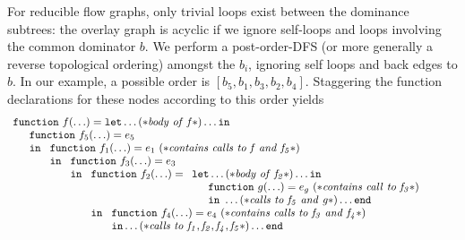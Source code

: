 For reducible flow graphs, only trivial loops exist between the
dominance subtrees: the overlay graph is acyclic if we ignore
self-loops and loops involving the common dominator $b$.  We perform a
post-order-DFS (or more generally a reverse topological ordering)
amongst the $b_i$, ignoring self loops and back edges to $b$. In our
example, a possible order is $[b_5,b_1,b_3,b_2,b_4]$.  Staggering the
function declarations for these nodes according to this order yields
\begin{equation}
\label{FunctionalCascadeFun}
\begin{array}{l}
  \mathtt{function}\ f (\ldots)= 
  \mathtt{let} \ldots (* \mathit{body\ of\ f}*)\ldots \mathtt{in}\\
  \quad \begin{array}{l}
          \mathtt{function}\ f_5(\ldots) = e_5\\ \mathtt{in}\  
          \begin{array}[t]{l}
            \mathtt{function}\ f_1(\ldots) = e_1\ 
                 (* \mathit{contains\ calls\ to\ f\ and\ f_5}*) \\ \mathtt{in}\ 
            \begin{array}[t]{l}
              \mathtt{function}\ f_3(\ldots) = e_3\\ \mathtt{in}\ 
              \begin{array}[t]{l}
                \mathtt{function}\ f_2(\ldots) =
                 \begin{array}[t]{l}
                    \mathtt{let} \ldots (* \mathit{body\ of\ f_2}*)\ldots
                      \mathtt{in}\\
                     \quad \begin{array}{l}
                        \mathtt{function}\ g(\ldots) = e_g\
                           (* \mathit{contains\ call\ to\ f_3}*)\\ 
                        \mathtt{in}\   \ldots 
                              (* \mathit{calls\ to\ f_5\ and\ g} *)
                        \ldots \mathtt{end}
                     \end{array}\\
                   \end{array}\\ \mathtt{in}\
                \begin{array}[t]{l}
                  \mathtt{function}\ f_4(\ldots) = e_4\
                    (* \mathit{contains\ calls\ to\ f_3\ and\ f_4}*) \\
                   \mathtt{in} \ldots 
                      (* \mathit{calls\ to\ f_1, f_2, f_4, f_5}*)
                   \ldots \mathtt{end}
                \end{array}
              \end{array}
            \end{array}
          \end{array}
        \end{array}
  \end{array}
\end{equation}
